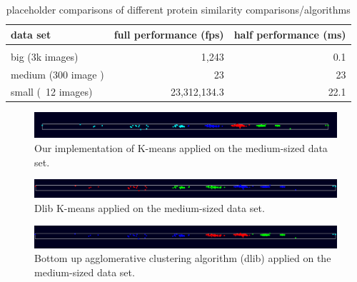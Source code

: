 \documentclass[journal]{vgtc}       %
\begin{document}
\begin{table}[!h]
  \caption{
  \label{tab:perf} placeholder comparisons of different protein similarity comparisons/algorithms}
  \centering
  \vspace{0.3em}
  \begin{tabular}{lrr}
  data set & full performance (fps) & half performance (ms)\\ \hline\\[-0.4em]
  big (3k images) & 1,243 & 0.1 \\
  medium (300 image ) & 23 & 23 \\
  small (~12 images) & 23,312,134.3 & 22.1 \\
  \end{tabular}
  \end{table}

\begin{figure}[h!]
	\begin{center}
		\includegraphics[width=.75\linewidth]{k-Means-mediumDataSet.png}
	\end{center}
	\caption{\label{fig:kmeans} Our implementation of K-means applied on the medium-sized data set.}
\end{figure} 
\begin{figure}[h!]
	\begin{center}
		\includegraphics[width=.75\linewidth]{k-Means-dlib-mediumDataSet.png}
	\end{center}
	\caption{\label{fig:kmeans-dlib} Dlib K-means applied on the medium-sized data set.}
\end{figure}
\begin{figure}[h!]
	\begin{center}
		\includegraphics[width=.75\linewidth]{bottomUpAgglomerative-mediumDataSet.png}
	\end{center}
	\caption{\label{fig:bottomUpAgglomerative} Bottom up agglomerative clustering algorithm (dlib) applied on the medium-sized data set.}
\end{figure}
\end{document}
